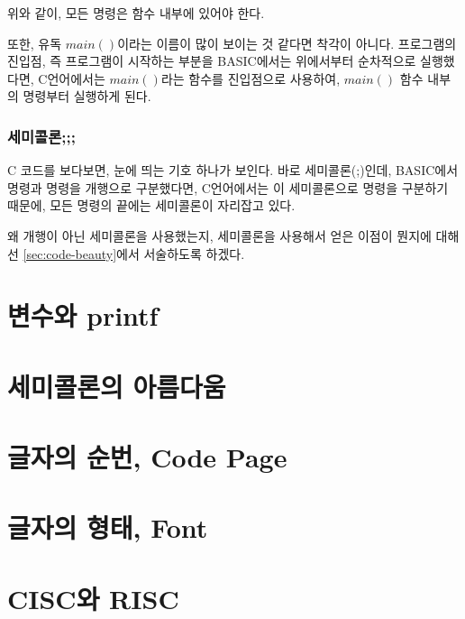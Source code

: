 \documentclass{article}
\begin{document}
위와 같이, 모든 명령은 함수 내부에 있어야 한다.

또한, 유독 $main()$이라는 이름이 많이 보이는 것 같다면 착각이 아니다.
프로그램의 진입점, 즉 프로그램이 시작하는 부분을 BASIC에서는 위에서부터 순차적으로 실행했다면,
C언어에서는 $main()$라는 함수를 진입점으로 사용하여, $main()$ 함수 내부의 명령부터 실행하게 된다.

\subsubsection{세미콜론;;;}

C 코드를 보다보면, 눈에 띄는 기호 하나가 보인다.
바로 세미콜론(;)인데, BASIC에서 명령과 명령을 개행으로 구분했다면,
C언어에서는 이 세미콜론으로 명령을 구분하기 때문에,
모든 명령의 끝에는 세미콜론이 자리잡고 있다.

왜 개행이 아닌 세미콜론을 사용했는지,
세미콜론을 사용해서 얻은 이점이 뭔지에 대해선 \autoref{sec:code-beauty}에서 서술하도록 하겠다.

\section{변수와 printf}

\appendix

\section{세미콜론의 아름다움}
\label{sec:code-beauty}

\section{글자의 순번, Code Page}
\label{sec:code-page}

\section{글자의 형태, Font}
\label{sec:fonts}

\section{CISC와 RISC}
\label{sec:cisc-risc}
\end{document}
